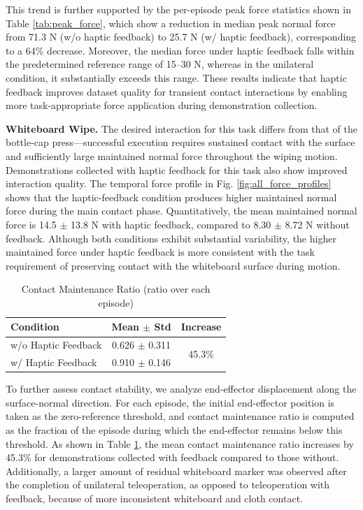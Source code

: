 \documentclass[letterpaper, 10 pt, conference]{ieeeconf}  %
\begin{document}
This trend is further supported by the per-episode peak force statistics shown in Table \ref{tab:peak_force}, which show a reduction in median peak normal force from 71.3 N (w/o haptic feedback) to 25.7 N (w/ haptic feedback), corresponding to a 64\% decrease. Moreover, the median force under haptic feedback falls within the predetermined reference range of 15--30 N, whereas in the unilateral condition, it substantially exceeds this range. These results indicate that haptic feedback improves dataset quality for transient contact interactions by enabling more task-appropriate force application during demonstration collection.

\textbf{Whiteboard Wipe.} The desired interaction for this task differs from that of the bottle-cap press---successful execution requires sustained contact with the surface and sufficiently large maintained normal force throughout the wiping motion. Demonstrations collected with haptic feedback for this task also show improved interaction quality. The temporal force profile in Fig. \ref{fig:all_force_profiles} shows that the haptic-feedback condition produces higher maintained normal force during the main contact phase. Quantitatively, the mean maintained normal force is 14.5 $\pm$ 13.8 N with haptic feedback, compared to 8.30 $\pm$ 8.72 N without feedback. Although both conditions exhibit substantial variability, the higher maintained force under haptic feedback is more consistent with the task requirement of preserving contact with the whiteboard surface during motion. 

\begin{table}[t]
\centering
\caption{Contact Maintenance Ratio (ratio over each episode)}
\label{tab:contact_main}
\begin{tabular}{lcc}
\toprule
\textbf{Condition} & \textbf{Mean $\pm$ Std} & \textbf{Increase} \\
\midrule
w/o Haptic Feedback & 0.626 $\pm$ 0.311 & \multirow{2}{*}{45.3\%} \\
w/ Haptic Feedback  & 0.910 $\pm$ 0.146 & \\
\bottomrule
\end{tabular}
\end{table}

To further assess contact stability, we analyze end-effector displacement along the surface-normal direction. For each episode, the initial end-effector position is taken as the zero-reference threshold, and contact maintenance ratio is computed as the fraction of the episode during which the end-effector remains below this threshold. As shown in Table \ref{tab:contact_main}, the mean contact maintenance ratio increases by 45.3\% for demonstrations collected with feedback compared to those without. Additionally, a larger amount of residual whiteboard marker was observed after the completion of unilateral teleoperation, as opposed to teleoperation with feedback, because of more inconsistent whiteboard and cloth contact.
\end{document}

